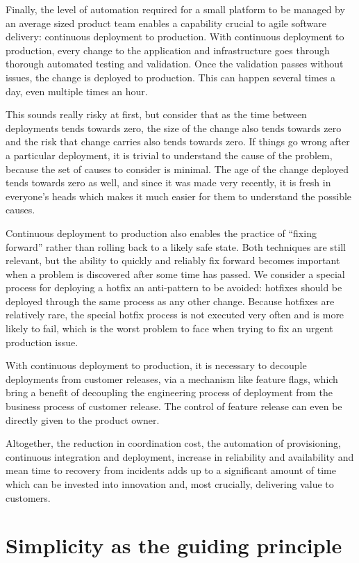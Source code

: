 \documentclass[reprint,amsmath,amssymb,aps]{revtex4-1}
\begin{document}
Finally, the level of automation required for a small platform to be managed by an average sized product team enables a capability crucial to agile software delivery: continuous deployment to production. With continuous deployment to production, every change to the application and infrastructure goes through thorough automated testing and validation. Once the validation passes without issues, the change is deployed to production. This can happen several times a day, even multiple times an hour.

This sounds really risky at first, but consider that as the time between deployments tends towards zero, the size of the change also tends towards zero and the risk that change carries also tends towards zero. If things go wrong after a particular deployment, it is trivial to understand the cause of the problem, because the set of causes to consider is minimal. The age of the change deployed tends towards zero as well, and since it was made very recently, it is fresh in everyone’s heads which makes it much easier for them to understand the possible causes.

Continuous deployment to production also enables the practice of “fixing forward” rather than rolling back to a likely safe state. Both techniques are still relevant, but the ability to quickly and reliably fix forward becomes important when a problem is discovered after some time has passed. We consider a special process for deploying a hotfix an anti-pattern to be avoided: hotfixes should be deployed through the same process as any other change. Because hotfixes are relatively rare, the special hotfix process is not executed very often and is more likely to fail, which is the worst problem to face when trying to fix an urgent production issue.

With continuous deployment to production, it is necessary to decouple deployments from customer releases, via a mechanism like feature flags, which bring a benefit of decoupling the engineering process of deployment from the business process of customer release. The control of feature release can even be directly given to the product owner.

Altogether, the reduction in coordination cost, the automation of provisioning, continuous integration and deployment, increase in reliability and availability and mean time to recovery from incidents adds up to a significant amount of time which can be invested into innovation and, most crucially, delivering value to customers.


\section{\label{sec:simplicity}Simplicity as the guiding principle}
\end{document}

